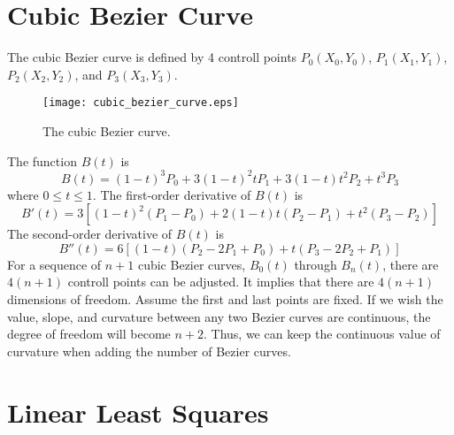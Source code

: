 \documentclass{turgon}
\begin{document}
\chapter{Cubic Bezier Curve}


The cubic Bezier curve is defined by 4 controll points $P_0(X_0, Y_0)$,
$P_1(X_1, Y_1)$, $P_2(X_2, Y_2)$, and $P_3(X_3, Y_3)$.
\begin{figure}[h]
    \centering
    \texttt{[image: cubic\_bezier\_curve.eps]}
    \caption{The cubic Bezier curve.}
    \label{f:cubic_bezier_curve}
\end{figure}

The function $B(t)$ is
\begin{equation}
    B(t) = (1-t)^3 P_0 + 3(1-t)^2 t P_1 + 3(1-t) t^2 P_2 + t^3 P_3
    \label{e:cbc:der0}
\end{equation}
where $0 \leq t \leq 1$.  The first-order derivative of $B(t)$ is
\begin{equation}
    B'(t) = 3\left[
      (1-t)^2 (P_1 - P_0) + 2(1-t)t(P_2 - P_1) + t^2(P_3 - P_2)
    \right]
\end{equation}
The second-order derivative of $B(t)$ is
\begin{equation}
    B''(t) = 6\left[(1-t)(P_2 - 2P_1 + P_0) + t(P_3 - 2P_2 + P_1)\right]
\end{equation}
For a sequence of $n+1$ cubic Bezier curves, $B_0(t)$ through $B_n(t)$,
there are $4(n+1)$ controll points can be adjusted. It implies that there
are $4(n+1)$ dimensions of freedom. Assume the first and last points are
fixed. If we wish the value, slope, and curvature between any two Bezier
curves are continuous, the degree of freedom will become $n+2$. Thus, we
can keep the continuous value of curvature when adding the number of Bezier
curves.

\chapter{Linear Least Squares}
\end{document}
